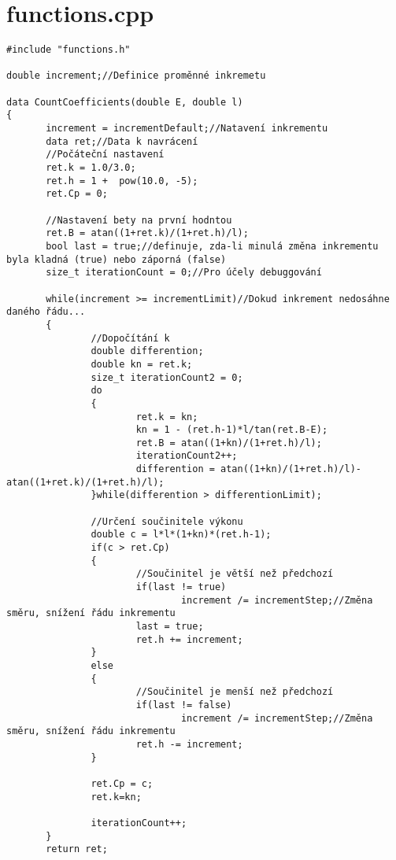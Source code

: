 \section{functions.cpp}
\begin{mylisting}
\begin{verbatim}
#include "functions.h"

double increment;//Definice proměnné inkremetu

data CountCoefficients(double E, double l)
{
       increment = incrementDefault;//Natavení inkrementu
       data ret;//Data k navrácení
       //Počáteční nastavení
       ret.k = 1.0/3.0;
       ret.h = 1 +  pow(10.0, -5);
       ret.Cp = 0;

       //Nastavení bety na první hodntou
       ret.B = atan((1+ret.k)/(1+ret.h)/l);
       bool last = true;//definuje, zda-li minulá změna inkrementu byla kladná (true) nebo záporná (false)
       size_t iterationCount = 0;//Pro účely debuggování

       while(increment >= incrementLimit)//Dokud inkrement nedosáhne daného řádu...
       {
               //Dopočítání k
               double differention;
               double kn = ret.k;
               size_t iterationCount2 = 0;
               do
               {
                       ret.k = kn;
                       kn = 1 - (ret.h-1)*l/tan(ret.B-E);
                       ret.B = atan((1+kn)/(1+ret.h)/l);
                       iterationCount2++;
                       differention = atan((1+kn)/(1+ret.h)/l)-atan((1+ret.k)/(1+ret.h)/l);
               }while(differention > differentionLimit);

               //Určení součinitele výkonu
               double c = l*l*(1+kn)*(ret.h-1);
               if(c > ret.Cp)
               {
                       //Součinitel je větší než předchozí
                       if(last != true)
                               increment /= incrementStep;//Změna směru, snížení řádu inkrementu
                       last = true;
                       ret.h += increment;
               }
               else
               {
                       //Součinitel je menší než předchozí
                       if(last != false)
                               increment /= incrementStep;//Změna směru, snížení řádu inkrementu
                       ret.h -= increment;
               }

               ret.Cp = c;
               ret.k=kn;

               iterationCount++;
       }
       return ret;

\end{verbatim}
\end{mylisting}